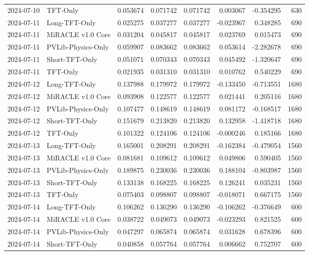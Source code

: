 \begin{tabular}{llrrrrrr}
2024-07-10 & TFT-Only & 0.053674 & 0.071742 & 0.071742 & 0.003067 & -0.354295 & 630 \\
2024-07-11 & Long-TFT-Only & 0.025275 & 0.037277 & 0.037277 & -0.023967 & 0.348285 & 690 \\
2024-07-11 & MiRACLE v1.0 Core & 0.031204 & 0.045817 & 0.045817 & 0.023769 & 0.015473 & 690 \\
2024-07-11 & PVLib-Physics-Only & 0.059907 & 0.083662 & 0.083662 & 0.053614 & -2.282678 & 690 \\
2024-07-11 & Short-TFT-Only & 0.051071 & 0.070343 & 0.070343 & 0.045492 & -1.320647 & 690 \\
2024-07-11 & TFT-Only & 0.021935 & 0.031310 & 0.031310 & 0.010762 & 0.540229 & 690 \\
2024-07-12 & Long-TFT-Only & 0.137988 & 0.179972 & 0.179972 & -0.133450 & -0.713551 & 1680 \\
2024-07-12 & MiRACLE v1.0 Core & 0.093908 & 0.122577 & 0.122577 & 0.021441 & 0.205116 & 1680 \\
2024-07-12 & PVLib-Physics-Only & 0.107477 & 0.148619 & 0.148619 & 0.081172 & -0.168517 & 1680 \\
2024-07-12 & Short-TFT-Only & 0.151679 & 0.213820 & 0.213820 & 0.132958 & -1.418718 & 1680 \\
2024-07-12 & TFT-Only & 0.101322 & 0.124106 & 0.124106 & -0.000246 & 0.185166 & 1680 \\
2024-07-13 & Long-TFT-Only & 0.165001 & 0.208291 & 0.208291 & -0.162384 & -0.479054 & 1560 \\
2024-07-13 & MiRACLE v1.0 Core & 0.081681 & 0.109612 & 0.109612 & 0.049806 & 0.590405 & 1560 \\
2024-07-13 & PVLib-Physics-Only & 0.189875 & 0.230036 & 0.230036 & 0.188104 & -0.803987 & 1560 \\
2024-07-13 & Short-TFT-Only & 0.133138 & 0.168225 & 0.168225 & 0.126241 & 0.035231 & 1560 \\
2024-07-13 & TFT-Only & 0.075403 & 0.098807 & 0.098807 & -0.018071 & 0.667175 & 1560 \\
2024-07-14 & Long-TFT-Only & 0.106262 & 0.136290 & 0.136290 & -0.106262 & -0.376649 & 600 \\
2024-07-14 & MiRACLE v1.0 Core & 0.038722 & 0.049073 & 0.049073 & -0.023293 & 0.821525 & 600 \\
2024-07-14 & PVLib-Physics-Only & 0.047297 & 0.065874 & 0.065874 & 0.031628 & 0.678396 & 600 \\
2024-07-14 & Short-TFT-Only & 0.040858 & 0.057764 & 0.057764 & 0.006662 & 0.752707 & 600 \\

\end{tabular}
